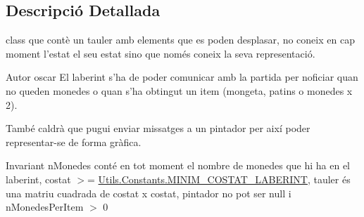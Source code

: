 \subsection{Descripció Detallada}
class que contè un tauler amb elements que es poden desplasar, no coneix en cap moment l'estat el seu estat sino que només coneix la seva representació. 

\begin{DoxyAuthor}{Autor}
oscar El laberint s'ha de poder comunicar amb la partida per noficiar quan no queden monedes o quan s'ha obtingut un item (mongeta, patins o monedes x 2).
\end{DoxyAuthor}
També caldrà que pugui enviar missatges a un pintador per així poder representar-\/se de forma gràfica.

\begin{DoxyInvariant}{Invariant}
n\+Monedes conté en tot moment el nombre de monedes que hi ha en el laberint, costat $>$= \hyperlink{classlogica_1_1_utils_1_1_constants_af0255617e604b0757200f05de64fa934}{Utils.\+Constants.\+M\+I\+N\+I\+M\+\_\+\+C\+O\+S\+T\+A\+T\+\_\+\+L\+A\+B\+E\+R\+I\+N\+T}, tauler és una matriu cuadrada de costat x costat, pintador no pot ser null i n\+Monedes\+Per\+Item $>$ 0 
\end{DoxyInvariant}


